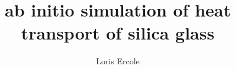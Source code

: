 \documentclass[krantz2,a4paper,11pt,ChapterTOCs,twoside,openright]{krantz}
\begin{document}
\frontmatter

\title{ab initio simulation of heat transport of silica glass}
\author{Loris Ercole}


%
\cleardoublepage

\tableofcontents

%
%
%
% 

\mainmatter
\thischaptertocfalse
\thischaptertoctrue
\thischaptertocfalse

\appendix




\end{document}
